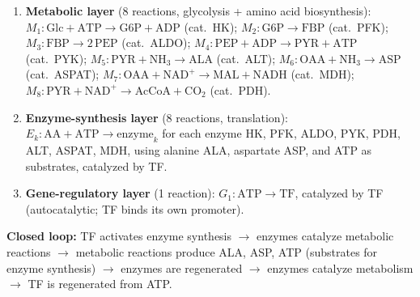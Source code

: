 \documentclass[11pt,a4paper]{article}
\theoremstyle{plain}
\theoremstyle{definition}
\theoremstyle{remark}
\begin{document}
\begin{enumerate}[leftmargin=*,itemsep=2pt]
\item \textbf{Metabolic layer} (8 reactions, glycolysis + amino acid
  biosynthesis): $M_1: \text{Glc} + \text{ATP} \to \text{G6P} + \text{ADP}$
  (cat.~HK); $M_2: \text{G6P} \to \text{FBP}$ (cat.~PFK);
  $M_3: \text{FBP} \to 2\,\text{PEP}$ (cat.~ALDO);
  $M_4: \text{PEP} + \text{ADP} \to \text{PYR} + \text{ATP}$ (cat.~PYK);
  $M_5: \text{PYR} + \text{NH}_3 \to \text{ALA}$ (cat.~ALT);
  $M_6: \text{OAA} + \text{NH}_3 \to \text{ASP}$ (cat.~ASPAT);
  $M_7: \text{OAA} + \text{NAD}^+ \to \text{MAL} + \text{NADH}$ (cat.~MDH);
  $M_8: \text{PYR} + \text{NAD}^+ \to \text{AcCoA} + \text{CO}_2$ (cat.~PDH).
\item \textbf{Enzyme-synthesis layer} (8 reactions, translation): $E_k:
  \text{AA} + \text{ATP} \to \text{enzyme}_k$ for each enzyme HK, PFK,
  ALDO, PYK, PDH, ALT, ASPAT, MDH, using alanine ALA, aspartate ASP,
  and ATP as substrates, catalyzed by TF.
\item \textbf{Gene-regulatory layer} (1 reaction): $G_1: \text{ATP} \to
  \text{TF}$, catalyzed by TF (autocatalytic; TF binds its own promoter).
\end{enumerate}

\textbf{Closed loop:} TF activates enzyme synthesis $\to$ enzymes catalyze
metabolic reactions $\to$ metabolic reactions produce ALA, ASP, ATP
(substrates for enzyme synthesis) $\to$ enzymes are regenerated $\to$
enzymes catalyze metabolism $\to$ TF is regenerated from ATP.
\end{document}
